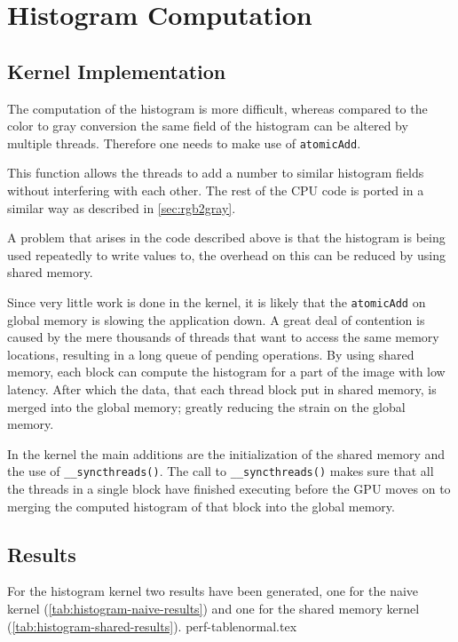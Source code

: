 \documentclass[final]{report}
\begin{document}
\chapter{Histogram Computation}

\section{Kernel Implementation}\label{sec:hist-kernel}
The computation of the histogram is more difficult, whereas compared to the color to gray conversion the same field of the histogram can be altered by multiple threads.
Therefore one needs to make use of \texttt{atomicAdd\(\)}.


This function allows the threads to add a number to similar histogram fields without interfering with each other.
The rest of the CPU code is ported in a similar way as described in \cref{sec:rgb2gray}.

A problem that arises in the code described above is that the histogram is being used repeatedly to write values to, the overhead on this can be reduced by using shared memory.

Since very little work is done in the kernel, it is likely that the \texttt{atomicAdd\(\)} on global memory is slowing the application down.
A great deal of contention is caused by the mere thousands of threads that want to access the same memory locations, resulting in a long queue of pending operations.
By using shared memory, each block can compute the histogram for a part of the image with low latency.
After which the data, that each thread block put in shared memory, is merged into the global memory; greatly reducing the strain on the global memory.

In the kernel the main additions are the initialization of the shared memory and the use of \texttt{\_\_syncthreads()}.
The call to \texttt{\_\_syncthreads()} makes sure that all the threads in a single block have finished executing before the GPU moves on to merging the computed histogram of that block into the global memory.

\section{Results}
For the histogram kernel two results have been generated, one for the naive kernel (\cref{tab:histogram-naive-results}) and one for the shared memory kernel (\cref{tab:histogram-shared-results}).
{perf-tablenormal.tex}
\end{document}
